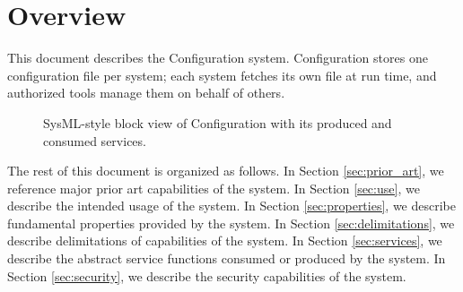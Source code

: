 \documentclass[a4paper]{arrowhead}
\begin{document}
\section{Overview}
\label{sec:overview}

This document describes the Configuration system. Configuration stores one configuration file per system; each system fetches its own file at run time, and authorized tools manage them on behalf of others.

\begin{figure}[ht!]
  \centering
  \caption{SysML-style block view of Configuration with its produced and consumed services.}
  \label{fig:system}
\end{figure}

The rest of this document is organized as follows.
In Section \ref{sec:prior_art}, we reference major prior art capabilities of the system.
In Section \ref{sec:use}, we describe the intended usage of the system.
In Section \ref{sec:properties}, we describe fundamental properties provided by the system.
In Section \ref{sec:delimitations}, we describe delimitations of capabilities of the system.
In Section \ref{sec:services}, we describe the abstract service functions consumed or produced by the system.
In Section \ref{sec:security}, we describe the security capabilities of the system.
\end{document}
